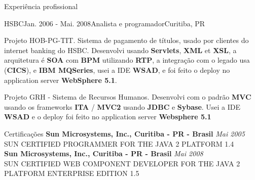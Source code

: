 \documentclass{resume}
\begin{document}
\begin{rSection}{Experiência profissional}
\begin{rSubsection}{HSBC}{Jan. 2006 - Mai. 2008}{Analista e programador}{Curitiba, PR}
    \item Projeto HOB-PG-TIT. Sistema de pagamento de títulos, usado por clientes do internet banking do HSBC. Desenvolvi usando \textbf{Servlets}, \textbf{XML} et \textbf{XSL}, a arquitetura é \textbf{SOA} com \textbf{BPM} utilizando \textbf{RTP}, a integração com o legado usa (\textbf{CICS}), e \textbf{IBM MQSeries}, usei a IDE \textbf{WSAD}, e foi feito o deploy no application server \textbf{WebSphere 5.1}.\\
    \item Projeto GRH - Sistema de Recursos Humanos. Desenvolvi com o padrão \textbf{MVC} usando os frameworks \textbf{ITA} / \textbf{MVC2} usando \textbf{JDBC} e \textbf{Sybase}. Usei a IDE \textbf{WSAD} e o deploy foi feito no application server \textbf{Websphere 5.1}
    \end{rSubsection}
  \end{rSection}

  \begin{rSection}{Certificações}
    {\bf Sun Microsystems, Inc., Curitiba - PR - Brasil} \hfill {\em Mai 2005} \\ 
    {SUN CERTIFIED PROGRAMMER FOR THE JAVA 2 PLATFORM 1.4} \\

    {\bf Sun Microsystems, Inc., Curitiba - PR - Brasil} \hfill {\em Mai 2008} \\ 
    {SUN CERTIFIED WEB COMPONENT DEVELOPER FOR THE JAVA 2 PLATFORM ENTERPRISE EDITION 1.5} \\
  \end{rSection}
  
\end{document}
